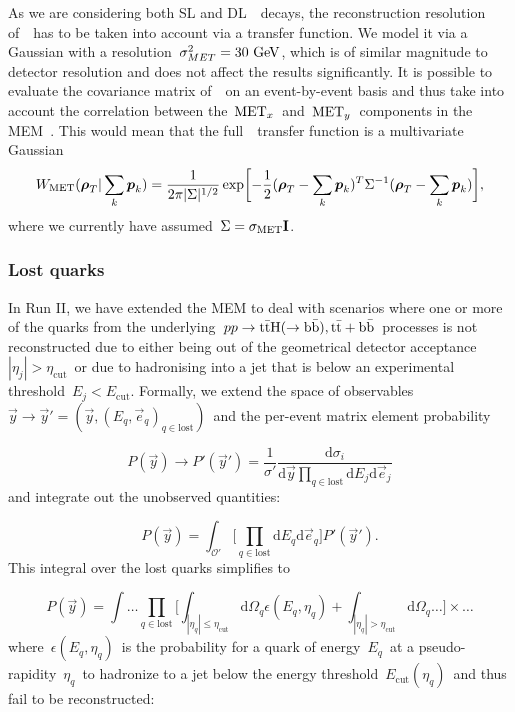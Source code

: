 As we are considering both SL and DL~\ttH~decays, the reconstruction resolution of~\MET~has to be taken into account via a transfer function. We model it via a Gaussian with a resolution~$\sigma_{MET}^2 = 30~\mathrm{GeV}$, which is of similar magnitude to detector resolution and does not affect the results significantly.
It is possible to evaluate the covariance matrix of~\MET~on an event-by-event basis and thus take into account the correlation between the~$\mathrm{MET}_x$~and~$\mathrm{MET}_y$~components in the MEM~\cite{cms_htautau}. This would mean that the full~\MET~transfer function is a multivariate Gaussian
\begin{equation}
W_{\mathrm{MET}}(\boldsymbol{\rho}_T | \sum_k \boldsymbol{p}_k) = \frac{1}{2\pi |\Sigma|^{1/2}} \exp \biggl[ -\frac{1}{2} (\boldsymbol{\rho}_T - \sum_k \boldsymbol{p}_k)^T \Sigma^{-1} (\boldsymbol{\rho}_T - \sum_k \boldsymbol{p}_k)\biggr],
\end{equation}
where we currently have assumed~$\Sigma = \sigma_{\mathrm{MET}} \mathbf{I}$.

\subsubsection{Lost quarks}
\label{sec:lost_quarks}

In Run II, we have extended the MEM to deal with scenarios where one or more of the quarks from the underlying~$pp \rightarrow \mathrm{t} \bar{\mathrm{t}} \mathrm{H}(\rightarrow \mathrm{b}\bar{\mathrm{b}}),\mathrm{t} \bar{\mathrm{t}} + \mathrm{b}\bar{\mathrm{b}}$~processes is not reconstructed due to either being out of the geometrical detector acceptance~$|\eta_j| > \eta_{\mathrm{cut}}$~or due to hadronising into a jet that is below an experimental threshold~$E_j < E_{\mathrm{cut}}$.
Formally, we extend the space of observables~$\vec{y} \rightarrow \vec{y}' = (\vec{y}, (E_q, \vec{e}_q)_{q \in \mathrm{lost}})$~and the per-event matrix element probability

\begin{equation}
P(\vec{y}) \rightarrow P'(\vec{y}') = \frac{1}{\sigma'} \frac{\mathrm{d} \sigma_i}{\mathrm{d}\vec{y} \prod_{q\in\mathrm{lost}} \mathrm{d}E_j \mathrm{d}\vec{e}_j}
\end{equation}
and integrate out the unobserved quantities:

\begin{equation}
P(\vec{y}) = \int_{\mathcal{O}'} \bigl[ \prod_{q \in \mathrm{lost}} \mathrm{d}E_q \mathrm{d}\vec{e}_q \bigr] P'(\vec{y}').
\end{equation}
This integral over the lost quarks simplifies to

\begin{equation}
P(\vec{y}) = \int \dots \prod_{q\in\mathrm{lost}} \biggl[ \int_{|\eta_q| \leq \eta_{\mathrm{cut}}} \mathrm{d}\Omega_q \epsilon(E_q, \eta_q) + \int_{|\eta_q| > \eta_{\mathrm{cut}}} \mathrm{d}\Omega_q \dots \biggr] \times \dots
\end{equation}
where~$\epsilon(E_q, \eta_q)$~is the probability for a quark of energy~$E_q$~at a pseudo-rapidity~$\eta_q$~to hadronize to a jet below the energy threshold~$E_{\mathrm{cut}}(\eta_q)$~and thus fail to be reconstructed:

